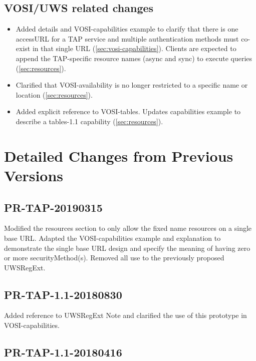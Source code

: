 \documentclass[11pt,letter]{ivoa}
\begin{document}
\subsection{VOSI/UWS related changes}

\begin{itemize}
\item Added details and VOSI-capabilities example to clarify that there is one accessURL for a TAP service and
multiple authentication methods must co-exist in that single URL (\ref{sec:vosi-capabilities}). Clients are
expected to append the TAP-specific resource names (async and sync) to execute queries (\ref{sec:resources}).

\item Clarified that VOSI-availability is no longer restricted to a
specific name or location (\ref{sec:resources}).

\item Added explicit reference to VOSI-tables. Updates capabilities example to describe a
tables-1.1 capability (\ref{sec:resources}).
\end{itemize}

\section{Detailed Changes from Previous Versions}

\subsection{PR-TAP-20190315}

Modified the resources section to only allow the fixed name resources on a single base URL. Adapted the 
VOSI-capabilities example and explanation to demonstrate the single base URL design and specify the meaning
of having zero or more securityMethod(s). Removed all use to the previously proposed UWSRegExt.

\subsection{PR-TAP-1.1-20180830}

Added reference to UWSRegExt Note and clarified the use of this prototype in VOSI-capabilities.

\subsection{PR-TAP-1.1-20180416}
\end{document}
